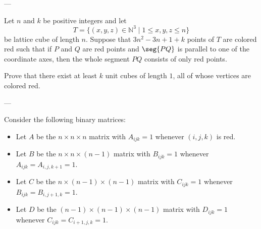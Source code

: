 
---

Let $n$ and $k$ be positive integers and let
\[T = \{(x,y,z)\in\mathbb N^3\mid1\le x,y,z\le n\}\]
be lattice cube of length $n$. Suppose that $3n^2-3n+1+k$ points of $T$ are colored red such that if $P$ and $Q$ are red points and $\seg{PQ}$ is parallel to one of the coordinate axes, then the whole segment $PQ$ consists of only red points.

Prove that there exist at least $k$ unit cubes of length $1$, all of whose vertices are colored red.

---

Consider the following binary matrices:
\begin{itemize}
    \item Let $A$ be the $n\times n\times n$ matrix with $A_{ijk}=1$ whenever $(i,j,k)$ is red.
    \item Let $B$ be the $n\times n\times(n-1)$ matrix with $B_{ijk}=1$ whenever $A_{ijk}=A_{i,j,k+1}=1$.
    \item Let $C$ be the $n\times(n-1)\times(n-1)$ matrix with $C_{ijk}=1$ whenever $B_{ijk}=B_{i,j+1,k}=1$.
    \item Let $D$ be the $(n-1)\times(n-1)\times(n-1)$ matrix with $D_{ijk}=1$ whenever $C_{ijk}=C_{i+1,j,k}=1$.
\end{itemize}
